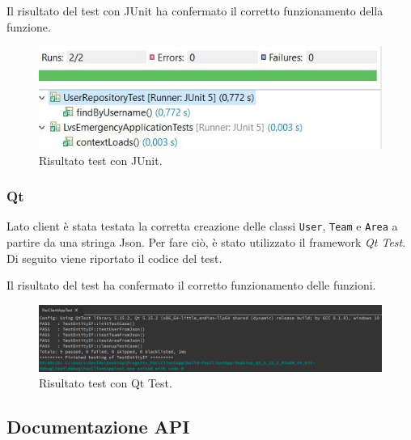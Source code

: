 

Il risultato del test con JUnit ha confermato il corretto funzionamento della funzione.

\begin{figure}[h!]
	\centering
	\includegraphics[width=1\linewidth]{./Iterazione 2/ImageFiles/TestJUnit}
	\caption{Risultato test con JUnit.}
	\label{fig:RisultatiTestJunitIT2}
\end{figure}

\subsubsection{Qt}
Lato client è stata testata la corretta creazione delle classi \texttt{User}, \texttt{Team} e \texttt{Area} a partire da una stringa Json. Per fare ciò, è stato utilizzato il framework \textit{Qt Test}. Di seguito viene riportato il codice del test.
 


Il risultato del test ha confermato il corretto funzionamento delle funzioni.

\begin{figure}[h!]
	\centering
	\includegraphics[width=1\linewidth]{./Iterazione 2/ImageFiles/TestQtTest}
	\caption{Risultato test con Qt Test.}
	\label{fig:RisultatiTestQTestIT2}
\end{figure}

\subsection{Documentazione API}

